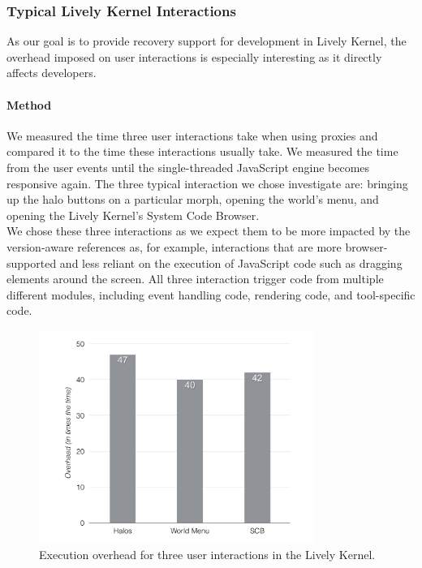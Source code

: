 \subsubsection{Typical Lively Kernel Interactions}

As our goal is to provide recovery support for development in Lively Kernel, the overhead imposed on user interactions is especially interesting as it directly affects developers.

\paragraph{Method}
We measured the time three user interactions take when using proxies and compared it to the time these interactions usually take.
We measured the time from the user events until the single-threaded JavaScript engine becomes responsive again.
The three typical interaction we chose investigate are: bringing up the halo buttons on a particular morph, opening the world's menu, and opening the Lively Kernel's System Code Browser.\\
We chose these three interactions as we expect them to be more impacted by the version-aware references as, for example, interactions that are more browser-supported and less reliant on the execution of JavaScript code such as dragging elements around the screen.
All three interaction trigger code from multiple different modules, including event handling code, rendering code, and tool-specific code.

\begin{figure}[h]
    \centering
    \includegraphics[width=0.8\textwidth]{figures/6_evaluation/4_LivelyInteractionsOverhead.pdf}
    \caption{Execution overhead for three user interactions in the Lively Kernel.}
    \label{fig:LivelyInteractionsOverhead}
\end{figure}

